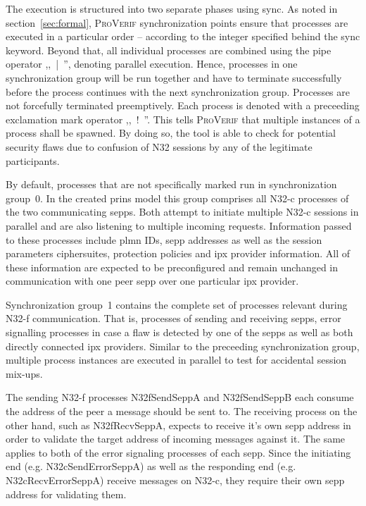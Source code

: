 The execution is structured into two separate phases using {\sffamily sync}.
As noted in section~\ref{sec:formal}, \textsc{ProVerif} synchronization points ensure that processes are executed in a particular order -- according to the integer specified behind the {\sffamily sync} keyword.
Beyond that, all individual processes are combined using the pipe operator ,,~{\sffamily |}~'', denoting parallel execution.
Hence, processes in one synchronization group will be run together and have to terminate successfully before the process continues with the next synchronization group.
Processes are not forcefully terminated preemptively.
Each process is denoted with a preceeding exclamation mark operator ,,~{\sffamily !}~''.
This tells \textsc{ProVerif} that multiple instances of a process shall be spawned.
By doing so, the tool is able to check for potential security flaws due to confusion of N32 sessions by any of the legitimate participants.

By default, processes that are not specifically marked run in synchronization group~0.
In the created \gls{prins} model this group comprises all N32-c processes of the two communicating \glspl{sepp}.
Both attempt to initiate multiple N32-c sessions in parallel and are also listening to multiple incoming requests.
Information passed to these processes include \gls{plmn} IDs, \gls{sepp} addresses as well as the session parameters ciphersuites, protection policies and \gls{ipx} provider information.
All of these information are expected to be preconfigured and remain unchanged in communication with one peer \gls{sepp} over one particular \gls{ipx} provider.

Synchronization group~1 contains the complete set of processes relevant during \mbox{N32-f} communication.
That is, processes of sending and receiving \glspl{sepp}, error signalling processes in case a flaw is detected by one of the \glspl{sepp} as well as both directly connected \gls{ipx} providers.
Similar to the preceeding synchronization group, multiple process instances are executed in parallel to test for accidental session mix-ups.

The sending N32-f processes {\sffamily N32fSendSeppA} and {\sffamily N32fSendSeppB} each consume the address of the peer a message should be sent to.
The receiving process on the other hand, such as {\sffamily N32fRecvSeppA}, expects to receive it's own \gls{sepp} address in order to validate the target address of incoming messages against it.
The same applies to both of the error signaling processes of each \gls{sepp}.
Since the initiating end (e.g. {\sffamily N32cSendErrorSeppA}) as well as the responding end (e.g. {\sffamily N32cRecvErrorSeppA}) receive messages on N32-c, they require their own \gls{sepp} address for validating them.

